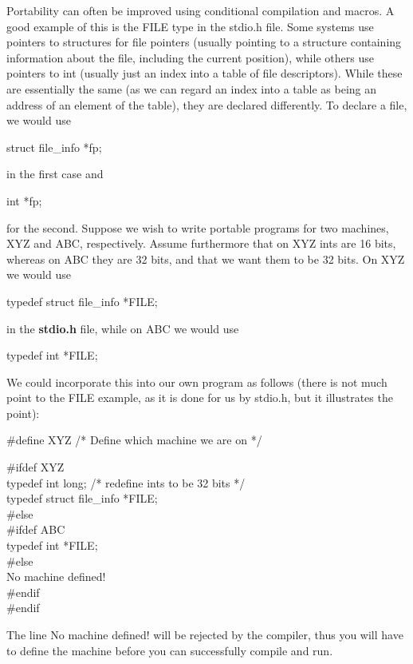      Portability can  often be  improved  using  conditional 
compilation  and macros. A  good example  of this  is the  {\cd FILE}
type  in the {\fn stdio.h} file. Some systems use  pointers to 
structures for  file pointers (usually pointing to a structure 
containing  information  about  the  file,  including  the  current
position), while  others use  pointers to  int (usually  just an 
index into a table of  file descriptors).  While these  are
essentially the same (as we can regard an  index into a table as
being an address of an element of the table), they are declared
differently. To declare a file, we would use
\begin{code}
struct file\_info *fp;
\end{code}
\noindent
     in the first case and
\begin{code}
int *fp;
\end{code}
\noindent
     for the second. Suppose we wish  to write  portable programs  for  two
machines,  XYZ and 
 ABC, respectively.  Assume furthermore that on XYZ {\cd int}s are 16 bits,
whereas on ABC they are 32 bits, and that we want them to be 32 bits. On
XYZ we would use
\begin{code}
typedef struct file\_info *FILE;
\end{code}
\noindent
     in the {\bf stdio.h} file, while on  ABC we would use
\begin{code}
typedef int *FILE;
\end{code}
\noindent
     We could  incorporate this  into our own program as follows
(there is not much point to the  {\cd FILE} example,  as it  is done  for
us  by {\fn stdio.h},  but it illustrates the point):
\begin{code}
       \#define XYZ  \tab /* Define which machine we are on */ \addVspace

       \#ifdef XYZ					 \\
       typedef int long; \tab /* redefine ints to be 32 bits */ \\
       typedef struct file\_info *FILE;			   \\
       \#else						   \\
       \#ifdef ABC					   \\
       typedef int *FILE;				   \\
       \#else						   \\
       No machine defined!				   \\
       \#endif						   \\
       \#endif
\end{code}
\noindent
     The line  {\cd No machine  defined!} will be rejected by the
compiler, thus you will have to define the machine before you can
successfully compile and run.

